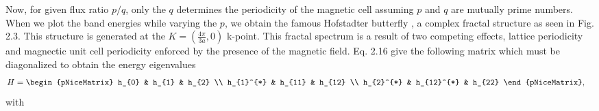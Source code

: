 \documentclass{report}
\begin{document}
Now, for given flux ratio $p/q$, only the $q$ determines the periodicity of the magnetic cell assuming $p$ and $q$ are mutually prime numbers. When we plot the band energies while varying the $p$, we obtain the famous Hofstadter butterfly \cite{PhysRevB.14.2239}, a complex fractal structure as seen in Fig. 2.3. This structure is generated at the $K = (\frac{4\pi}{3a},0)$ k-point. This fractal spectrum is a result of two competing effects, lattice periodicity and magnectic unit cell periodicity enforced by the presence of the magnetic field. Eq. 2.16 give the following matrix which must be diagonalized to obtain the energy eigenvalues
\begin{equation}
	\renewcommand{\arraystretch}{0.85}
	\begin{aligned}
		H
		 & =
		\begin{pNiceMatrix}
			h_{0}     & h_{1}      & h_{2}  \\
			h_{1}^{*} & h_{11}     & h_{12} \\
			h_{2}^{*} & h_{12}^{*} & h_{22}
		\end{pNiceMatrix},
	\end{aligned}
\end{equation}
with
\end{document}
